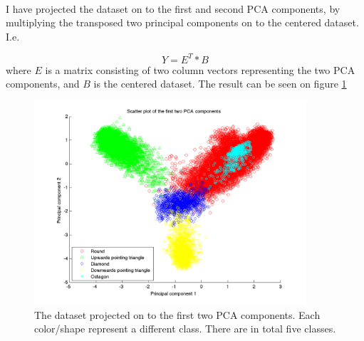 \documentclass[10pt]{article}
\begin{document}
\begin{figure}[ht]
\centering
\mbox{
     \quad
}                    
\end{figure}
I have projected the dataset on to the first and second PCA components, by multiplying the transposed two principal components on to the centered dataset. I.e.

\begin{equation}
  Y = E^T*B  
\end{equation}
where $E$ is a matrix consisting of two column vectors representing the two PCA components, and $B$ is the centered dataset. The result can be seen on figure \ref{fig3}

\begin{figure}[ht]
\centering
\includegraphics[width=0.9\textwidth]{figures/q2-2.png}
\caption{The dataset projected on to the first two PCA components. Each color/shape represent a different class. There are in total five classes.}
\label{fig3}
\end{figure}
\end{document}
